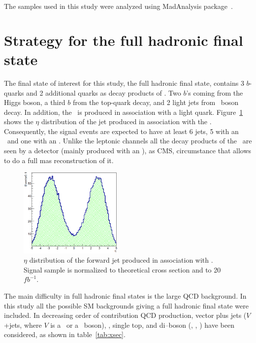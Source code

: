 The samples used in this study were analyzed using MadAnalysis package~\cite{Conte:2012fm, Conte:2014zja}.

\section{Strategy for the full hadronic final state}
\label{sec:Pstra}

The final state of interest for this study, the full hadronic final state, contains 3 $b$-quarks and 2 additional quarks as decay products of \Tp. Two $b$'s coming from the Higgs boson, a third $b$ from the top-quark decay, and 2 light jets from \W~boson decay. In addition, the \Tp~is produced in association with a light quark. Figure~\ref{fig:ForwJ} shows the $\eta$ distribution of the jet produced in association with the \Tp. Consequently, the signal events are expected to have at least 6 jets, 5 with an ~and one with an . Unlike the leptonic channels all the decay products of the \Tp~are seen by a detector (mainly produced with an ), as CMS, circumstance that allows to do a full mas reconstruction of it.

\begin{figure}[!Hhtbp]
  \begin{center}
    \includegraphics[width=0.45\textwidth]{figs/Pheno/SixthJet.png}
    \caption{$\eta$ distribution of the forward jet produced in association with \Tp. Signal sample is normalized to theoretical cross section and to 20~$fb^{-1}$.}
    \label{fig:ForwJ}
  \end{center}
\end{figure}

The main difficulty in full hadronic final states is the large QCD background. In this study all the possible SM backgrounds giving a full hadronic final state were included. In decreasing order of contribution QCD production, vector plus jets ($V$+jets, where $V$ is a \W~or a \Z~boson), \ttbar, single top, and di--boson (\W\W, \W\Z, \Z\Z) have been considered, as shown in table~\ref{tab:xsec}. 

